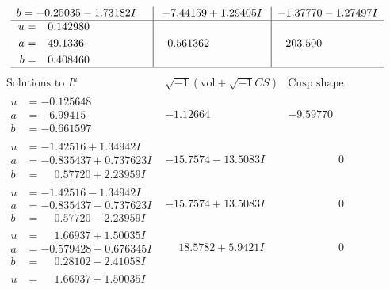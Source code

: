 \documentclass[1p]{elsarticle_modified}
\theoremstyle{definition}
\newcommand{\I}{\sqrt{-1}}
\begin{document}
$$\begin{array}{c|c|c}
\begin{aligned}
b &= -0.25035 - 1.73182 I\end{aligned}
 & -7.44159 + 1.29405 I & -1.37770 - 1.27497 I \\ \hline\begin{aligned}
u &= \phantom{-}0.142980\phantom{ +0.000000I} \\
a &= \phantom{-}49.1336\phantom{ +0.000000I} \\
b &= \phantom{-}0.408460\phantom{ +0.000000I}\end{aligned}
 & \phantom{-}0.561362\phantom{ +0.000000I} & \phantom{-}203.500\phantom{ +0.000000I}\\
 \hline 
 \end{array}$$\newpage$$\begin{array}{c|c|c}  
\text{Solutions to }I^u_{1}& \I (\text{vol} + \sqrt{-1}CS) & \text{Cusp shape}\\
 \hline 
\begin{aligned}
u &= -0.125648\phantom{ +0.000000I} \\
a &= -6.99415\phantom{ +0.000000I} \\
b &= -0.661597\phantom{ +0.000000I}\end{aligned}
 & -1.12664\phantom{ +0.000000I} & -9.59770\phantom{ +0.000000I} \\ \hline\begin{aligned}
u &= -1.42516 + 1.34942 I \\
a &= -0.835437 + 0.737623 I \\
b &= \phantom{-}0.57720 + 2.23959 I\end{aligned}
 & -15.7574 - 13.5083 I & \phantom{-0.000000 } 0 \\ \hline\begin{aligned}
u &= -1.42516 - 1.34942 I \\
a &= -0.835437 - 0.737623 I \\
b &= \phantom{-}0.57720 - 2.23959 I\end{aligned}
 & -15.7574 + 13.5083 I & \phantom{-0.000000 } 0 \\ \hline\begin{aligned}
u &= \phantom{-}1.66937 + 1.50035 I \\
a &= -0.579428 - 0.676345 I \\
b &= \phantom{-}0.28102 - 2.41058 I\end{aligned}
 & \phantom{-}18.5782 + 5.9421 I & \phantom{-0.000000 } 0 \\ \hline\begin{aligned}
u &= \phantom{-}1.66937 - 1.50035 I \\

\end{aligned}
\end{array}$$
\end{document}
